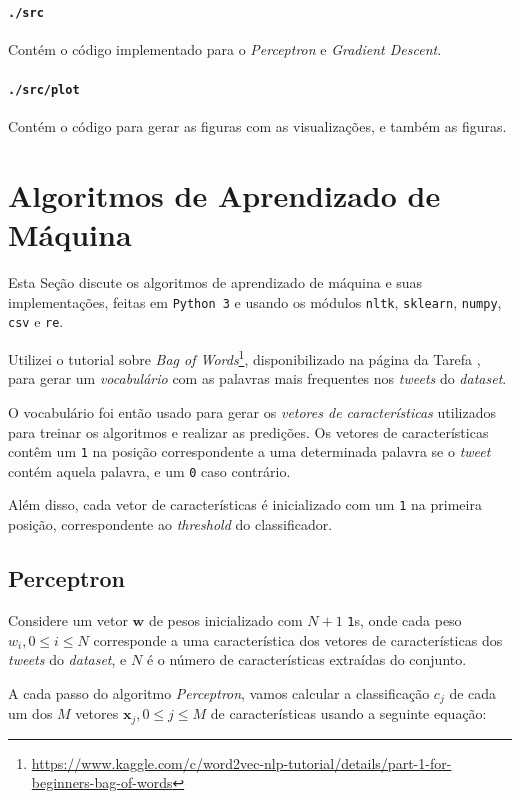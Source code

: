 \documentclass[a4paper, 12pt]{article}
\newcommand{\rom}[1]{\uppercase\expandafter{\romannumeral #1\relax}}
\begin{document}
\paragraph{\texttt{./src}} Contém o código implementado
para o \textit{Perceptron} e \textit{Gradient Descent}.

\paragraph{\texttt{./src/plot}} Contém o código para
gerar as figuras com as visualizações, e também as figuras.

\section{Algoritmos de Aprendizado de Máquina}

Esta Seção discute os algoritmos de aprendizado de máquina
e suas implementações, feitas em \texttt{Python 3} e usando os
módulos \texttt{nltk}, \texttt{sklearn}, \texttt{numpy},
\texttt{csv} e \texttt{re}.

Utilizei o tutorial sobre \textit{Bag of
Words}\footnote{\url{https://www.kaggle.com/c/word2vec-nlp-tutorial/details/part-1-for-beginners-bag-of-words}},
disponibilizado na página da Tarefa \rom{1}, para gerar um \textit{vocabulário}
com as palavras mais frequentes nos \textit{tweets} do \textit{dataset}.

O vocabulário foi então usado para gerar os \textit{vetores de características}
utilizados para treinar os algoritmos e realizar as predições.
Os vetores de características contêm um \texttt{1} na posição
correspondente a uma determinada palavra se o \textit{tweet}
contém aquela palavra, e um \texttt{0} caso contrário.

Além disso, cada vetor de características é inicializado com
um \texttt{1} na primeira posição, correspondente ao
\textit{threshold} do classificador.

\subsection{Perceptron} \label{sec:percep}

Considere um vetor $\boldsymbol{w}$ de pesos inicializado com $N + 1$
\texttt{1}s, onde cada peso $w_i, 0 \leq i \leq N$ corresponde a uma
característica dos vetores de características dos \textit{tweets} do
\textit{dataset}, e $N$ é o número de características extraídas do conjunto.

A cada passo do algoritmo \textit{Perceptron}, vamos calcular a classificação
$c_j$ de cada um dos $M$ vetores $\boldsymbol{x}_j, 0 \leq j \leq M$ de características
usando a seguinte equação:
\end{document}
